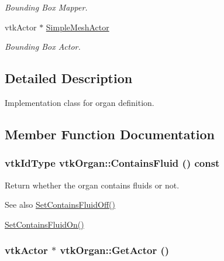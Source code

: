 \begin{DoxyCompactItemize}
\begin{DoxyCompactList}\small\item\em Bounding Box Mapper. \item\end{DoxyCompactList}\item 
\hypertarget{classvtkOrgan_ae2258f7405bc1cb0dfa2622850306215}{
vtkActor $\ast$ \hyperlink{classvtkOrgan_ae2258f7405bc1cb0dfa2622850306215}{SimpleMeshActor}}
\label{classvtkOrgan_ae2258f7405bc1cb0dfa2622850306215}

\begin{DoxyCompactList}\small\item\em Bounding Box Actor. \item\end{DoxyCompactList}\end{DoxyCompactItemize}


\subsection{Detailed Description}
Implementation class for organ definition. 

\subsection{Member Function Documentation}
\hypertarget{classvtkOrgan_a180c5871366dca3c20ec81235ad0f618}{
\subsubsection[{ContainsFluid}]{\setlength{\rightskip}{0pt plus 5cm}vtkIdType vtkOrgan::ContainsFluid () const}}
\label{classvtkOrgan_a180c5871366dca3c20ec81235ad0f618}


Return whether the organ contains fluids or not. \begin{DoxySeeAlso}{See also}
\hyperlink{classvtkOrgan_a387870655644666d7e337071ebca3708}{SetContainsFluidOff()} 

\hyperlink{classvtkOrgan_a776239497bc5ca06cdea73d5dd572000}{SetContainsFluidOn()} 
\end{DoxySeeAlso}
\hypertarget{classvtkOrgan_af12bcf578df2448068251a80b08822c1}{
\subsubsection[{GetActor}]{\setlength{\rightskip}{0pt plus 5cm}vtkActor $\ast$ vtkOrgan::GetActor ()}}
\label{classvtkOrgan_af12bcf578df2448068251a80b08822c1}


